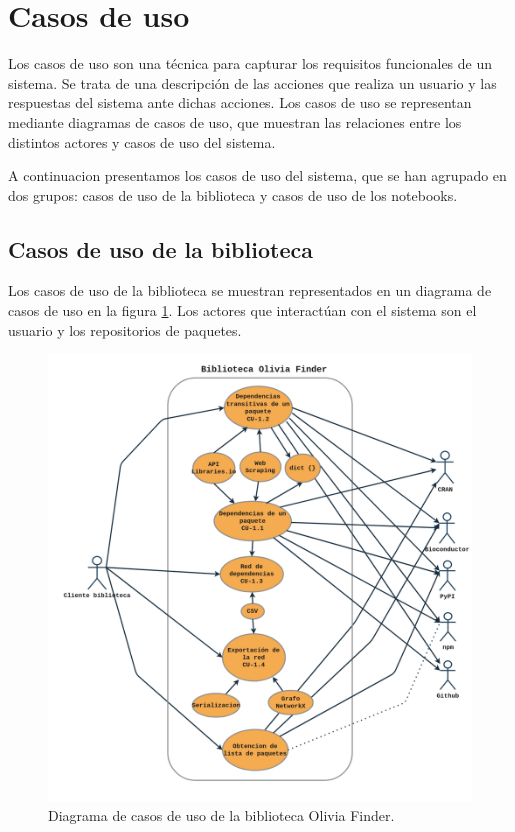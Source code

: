 \section{Casos de uso}

Los casos de uso son una técnica para capturar los requisitos funcionales de un sistema. Se trata de una
descripción de las acciones que realiza un usuario y las respuestas del sistema ante dichas acciones.
Los casos de uso se representan mediante diagramas de casos de uso, que muestran las relaciones entre los distintos actores y casos de uso del sistema.

A continuacion presentamos los casos de uso del sistema, que se han agrupado en dos grupos: casos de uso de la biblioteca y casos de uso de los notebooks.

\subsection{Casos de uso de la biblioteca}

Los casos de uso de la biblioteca se muestran representados en un diagrama de casos de uso en la figura \ref{fig:casos_de_uso}.
Los actores que interactúan con el sistema son el usuario y los repositorios de paquetes.

\begin{figure}[h]
	\centering
	\includegraphics[width=1\textwidth]{img/anexos/CU_of.png}
	\caption{Diagrama de casos de uso de la biblioteca Olivia Finder.}
	\label{fig:casos_de_uso}
\end{figure}



